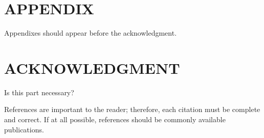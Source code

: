 \documentclass[letterpaper, 10 pt, conference]{ieeeconf}  %
\begin{document}
\addtolength{\textheight}{-12cm}   %







\section*{APPENDIX}

Appendixes should appear before the acknowledgment.

\section*{ACKNOWLEDGMENT}

Is this part necessary?


References are important to the reader; therefore, each citation must be complete and correct. If at all possible, references should be commonly available publications.
\end{document}
